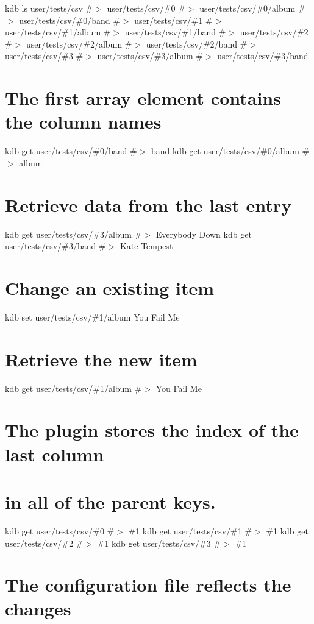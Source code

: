 kdb ls user/tests/csv \#$>$ user/tests/csv/\#0 \#$>$ user/tests/csv/\#0/album \#$>$ user/tests/csv/\#0/band \#$>$ user/tests/csv/\#1 \#$>$ user/tests/csv/\#1/album \#$>$ user/tests/csv/\#1/band \#$>$ user/tests/csv/\#2 \#$>$ user/tests/csv/\#2/album \#$>$ user/tests/csv/\#2/band \#$>$ user/tests/csv/\#3 \#$>$ user/tests/csv/\#3/album \#$>$ user/tests/csv/\#3/band\hypertarget{autotoc_md124_autotoc_md132}{}\section{The first array element contains the column names}\label{autotoc_md124_autotoc_md132}
kdb get user/tests/csv/\#0/band \#$>$ band kdb get user/tests/csv/\#0/album \#$>$ album\hypertarget{autotoc_md124_autotoc_md133}{}\section{Retrieve data from the last entry}\label{autotoc_md124_autotoc_md133}
kdb get user/tests/csv/\#3/album \#$>$ Everybody Down kdb get user/tests/csv/\#3/band \#$>$ Kate Tempest\hypertarget{autotoc_md124_autotoc_md134}{}\section{Change an existing item}\label{autotoc_md124_autotoc_md134}
kdb set user/tests/csv/\#1/album \textquotesingle{}You Fail Me\textquotesingle{} \hypertarget{autotoc_md124_autotoc_md135}{}\section{Retrieve the new item}\label{autotoc_md124_autotoc_md135}
kdb get user/tests/csv/\#1/album \#$>$ You Fail Me\hypertarget{autotoc_md124_autotoc_md136}{}\section{The plugin stores the index of the last column}\label{autotoc_md124_autotoc_md136}
\hypertarget{autotoc_md124_autotoc_md137}{}\section{in all of the parent keys.}\label{autotoc_md124_autotoc_md137}
kdb get user/tests/csv/\#0 \#$>$ \#1 kdb get user/tests/csv/\#1 \#$>$ \#1 kdb get user/tests/csv/\#2 \#$>$ \#1 kdb get user/tests/csv/\#3 \#$>$ \#1\hypertarget{autotoc_md124_autotoc_md138}{}\section{The configuration file reflects the changes}\label{autotoc_md124_autotoc_md138}
